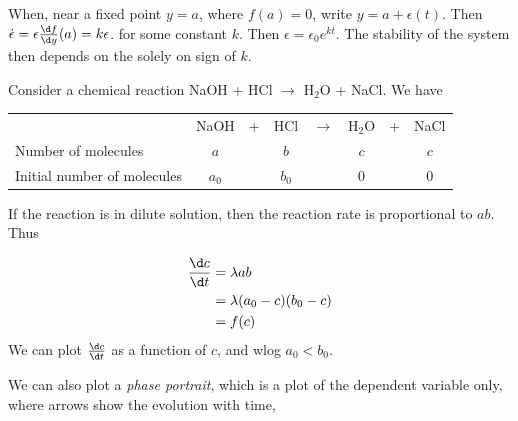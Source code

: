 \documentclass[a4paper]{article}
\begin{document}
When, near a fixed point $y = a$, where $f(a) = 0$, write $y = a + \epsilon(t)$. Then $\dot \epsilon = \epsilon\frac{\d f}{\d y}(a) = k\epsilon$. for some constant $k$. Then $\epsilon = \epsilon_0 e^{kt}$. The stability of the system then depends on the solely on sign of $k$.

\begin{eg}
  Consider a chemical reaction NaOH + HCl $\rightarrow$ H$_2$O + NaCl. We have\vspace{4pt} \\
\begin{tabular}{lccccccc}
                            & NaOH  & + & HCl   & $\rightarrow$ & H$_2$O & + & NaCl \\
Number of molecules         & $a$   &   & $b$   &               & $c$    &   & $c$  \\
Initial number of molecules & $a_0$ &   & $b_0$ &               & $0$    &   & $0$
\end{tabular}
\vspace{4pt}

If the reaction is in dilute solution, then the reaction rate is proportional to $ab$. Thus

\begin{align*}
  \frac{\d c}{\d t} &= \lambda ab\\
  &= \lambda (a_0 - c)(b_0 - c)\\
  &= f(c)
\end{align*}
We can plot $\frac{\d c}{\d t}$ as a function of $c$, and wlog $a_0 < b_0$.

\begin{center}
\end{center}

We can also plot a \emph{phase portrait}, which is a plot of the dependent variable only, where arrows show the evolution with time,

\begin{center}
\end{center}


\end{eg}
\end{document}
